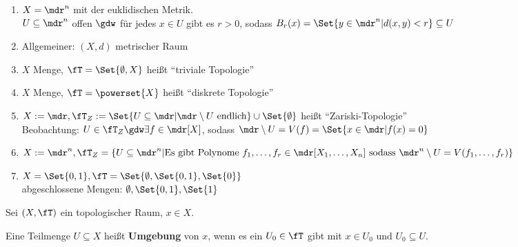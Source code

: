 \begin{beispieleX}
    \begin{enumerate}[1)]
        \item $X = \mdr^n$ mit der euklidischen Metrik.\\
              $U \subseteq \mdr^n$ offen $\gdw$ für jedes $x \in U$ 
              gibt es $r > 0$, sodass $B_r(x) = \Set{y \in \mdr^n | d(x,y) < r} \subseteq U$
        \item Allgemeiner: $(X, d)$ metrischer Raum
        \item $X$ Menge, $\fT = \Set{\emptyset, X}$ heißt \enquote{triviale Topologie} 
        \item $X$ Menge, $\fT = \powerset{X}$ heißt \enquote{diskrete Topologie} 
        \item $X :=\mdr, \fT_Z := \Set{U \subseteq \mdr | \mdr \setminus U \text{ endlich}} \cup \Set{\emptyset}$ heißt \enquote{Zariski-Topologie} \\
              Beobachtung: $U \in \fT_Z \gdw \exists f \in \mdr[X]$, sodass $\mdr \setminus U = V(f) = \Set{x \in \mdr | f(x) = 0}$
        \item $X := \mdr^n, \fT_Z = \{U \subseteq \mdr^n | \text{Es gibt Polynome } f_1, \dots, f_r \in \mdr[X_1, \dots, X_n] \text{ sodass }\\\mdr^n \setminus U = V(f_1, \dots, f_r)\}$
        \item $X = \Set{0,1}, \fT = \Set{\emptyset, \Set{0,1}, \Set{0}}$\\
              abgeschlossene Mengen: $\emptyset, \Set{0,1}, \Set{1}$
    \end{enumerate}
\end{beispieleX}

\begin{definition} 
    Sei $(X, \fT)$ ein topologischer Raum, $x \in X$.

    Eine Teilmenge $U \subseteq X$ heißt \textbf{Umgebung} von $x$,
    wenn es ein $U_0 \in \fT$ gibt mit $x \in U_0$ und $U_0 \subseteq U$.
\end{definition}

